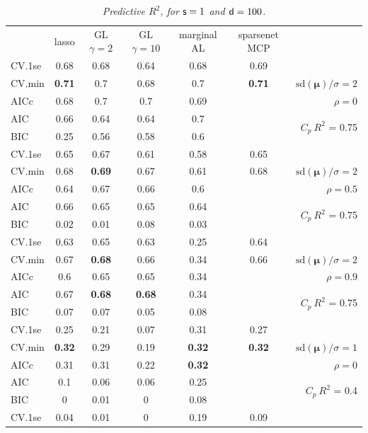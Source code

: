 \documentclass[12pt]{article}
\newcommand{\mr}[1]{\mathrm{#1}}
\newcommand{\bm}[1]{\mathbf{#1}}
\begin{document}
\begin{table}[p]\vspace{-.5cm}
\caption[l]{\it Predictive $R^2$, for ${\sf s}=1$ and  ${\sf d}=100$.}
\vspace{-.5cm}
\small{}
\begin{center}
\begin{tabular}{l*{5}{c}|r}
 & lasso & GL $\gamma=2$ & GL $\gamma=10$ & marginal AL & sparsenet MCP  &  \\
\cline{1-7}
CV.1se & 0.68 & 0.68 & 0.64 & 0.68 & 0.69 &\\
CV.min & {\bf 0.71} & 0.7 & 0.68 & 0.7 & {\bf 0.71} &  $\mr{sd}(\bm{\mu})/\sigma=2$ \\
AICc & 0.68 & 0.7 & 0.7 & 0.69 & & $\rho=0$ \\
AIC & 0.66 & 0.64 & 0.64 & 0.7 & & \multirow{2}{*}{$C_p ~ R^2$ = 0.75} \\
BIC & 0.25 & 0.56 & 0.58 & 0.6 & & \\
 \hline 
CV.1se & 0.65 & 0.67 & 0.61 & 0.58 & 0.65 &\\
CV.min & 0.68 & {\bf 0.69} & 0.67 & 0.61 & 0.68 &  $\mr{sd}(\bm{\mu})/\sigma=2$ \\
AICc & 0.64 & 0.67 & 0.66 & 0.6 & & $\rho=0.5$ \\
AIC & 0.66 & 0.65 & 0.65 & 0.64 & & \multirow{2}{*}{$C_p ~ R^2$ = 0.75} \\
BIC & 0.02 & 0.01 & 0.08 & 0.03 & & \\
 \hline 
CV.1se & 0.63 & 0.65 & 0.63 & 0.25 & 0.64 &\\
CV.min & 0.67 & {\bf 0.68} & 0.66 & 0.34 & 0.66 &  $\mr{sd}(\bm{\mu})/\sigma=2$ \\
AICc & 0.6 & 0.65 & 0.65 & 0.34 & & $\rho=0.9$ \\
AIC & 0.67 & {\bf 0.68} & {\bf 0.68} & 0.34 & & \multirow{2}{*}{$C_p ~ R^2$ = 0.75} \\
BIC & 0.07 & 0.07 & 0.05 & 0.08 & & \\
 \hline 
CV.1se & 0.25 & 0.21 & 0.07 & 0.31 & 0.27 &\\
CV.min & {\bf 0.32} & 0.29 & 0.19 & {\bf 0.32} & {\bf 0.32} &  $\mr{sd}(\bm{\mu})/\sigma=1$ \\
AICc & 0.31 & 0.31 & 0.22 & {\bf 0.32} & & $\rho=0$ \\
AIC & 0.1 & 0.06 & 0.06 & 0.25 & & \multirow{2}{*}{$C_p ~ R^2$ = 0.4} \\
BIC & 0 & 0.01 & 0 & 0.08 & & \\
 \hline 
CV.1se & 0.04 & 0.01 & 0 & 0.19 & 0.09 &\\

\end{tabular}
\end{center}
\end{table}
\end{document}

